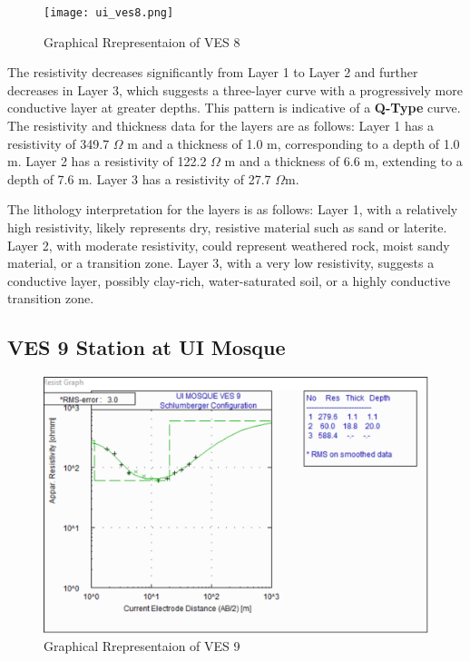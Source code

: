 \documentclass[12pt,a4paper]{report}
\begin{document}
\begin{figure}[H]
    \centering
    \texttt{[image: ui\_ves8.png]}
    \caption{Graphical Rrepresentaion of VES 8}
    \label{fig:VES_8_Curve}
\end{figure}

The resistivity decreases significantly from Layer 1 to Layer 2 and further decreases in Layer 3, which suggests a three-layer curve with a progressively more conductive layer at greater depths. This pattern is indicative of a \textbf{Q-Type} curve. The resistivity and thickness data for the layers are as follows: Layer 1 has a resistivity of 349.7 $\Omega$ m and a thickness of 1.0 m, corresponding to a depth of 1.0 m. Layer 2 has a resistivity of 122.2 $\Omega$ m and a thickness of 6.6 m, extending to a depth of 7.6 m. Layer 3 has a resistivity of 27.7 $\Omega$m.

The lithology interpretation for the layers is as follows: Layer 1, with a relatively high resistivity, likely represents dry, resistive material such as sand or laterite. Layer 2, with moderate resistivity, could represent weathered rock, moist sandy material, or a transition zone. Layer 3, with a very low resistivity, suggests a conductive layer, possibly clay-rich, water-saturated soil, or a highly conductive transition zone.

\subsection{VES 9 Station at UI Mosque}

\begin{figure}[H]
    \centering
    \includegraphics[width=1.0\textwidth]{ui_ves9.png}
    \caption{Graphical Rrepresentaion of VES 9}
    \label{fig:VES_9_Curve}
\end{figure}
\end{document}
